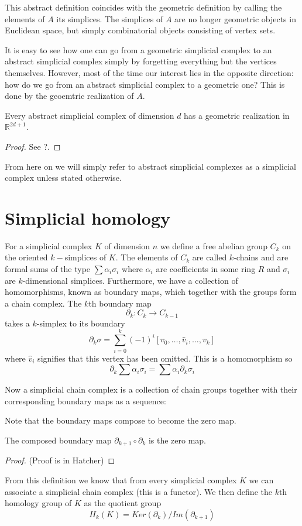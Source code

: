 This abstract definition coincides with the geometric definition by calling the elements of $A$ its simplices. The simplices of $A$ are no longer geometric objects in Euclidean space, but simply combinatorial objects consisting of vertex sets.

It is easy to see how one can go from a geometric simplicial complex to an abstract simplicial complex simply by forgetting everything but the vertices themselves. However, most of the time our interest lies in the opposite direction: how do we go from an abstract simplicial complex to a geometric one? This is done by the geoemtric realization of $A$.

\begin{theorem}
Every abstract simplicial complex of dimension $d$ has a geometric realization in $\mathbb{R}^{2d+1}$.
\end{theorem}
\begin{proof}
See ?.
\end{proof}%
From here on we will simply refer to abstract simplicial complexes as a simplicial complex unless stated otherwise.
\section{Simplicial homology}
For a simplicial complex $K$ of dimension $n$ we define a free abelian group $C_{k}$ on the oriented $k-$simplices of $K$.
The elements of $C_{k}$ are called $k$-chains and are formal sums of the type
$\sum \alpha_{i} \sigma_{i}$
where $\alpha_{i}$ are coefficients in some ring $R$ and $\sigma_{i}$ are $k$-dimensional simplices. Furthermore, we have a collection of homomorphisms, known as boundary maps, which together with the groups form a chain complex. The $k$th boundary map
\[ \partial_{k}: C_{k} \to C_{k-1}\]
takes a $k$-simplex to its boundary
\[ \partial_{k} \sigma = \sum^{k}_{{i=0}} (-1)^{i} [v_{0},\dots,\hat v_{i}, \dots, v_{k}]\]
where $\hat v_{i}$ signifies that this vertex has been omitted. This is a homomorphism so
\[\partial_{k} \sum \alpha_{i}\sigma_{i} = \sum \alpha_{i} \partial_{k} \sigma_{i}\]

Now a simplicial chain complex is a collection of chain groups together with their corresponding boundary maps as a sequence:
\begin{center}
\end{center}
Note that the boundary maps compose to become the zero map.
\begin{theorem}
The composed boundary map $\partial_{k+1} \circ \partial_{k}$ is the zero map.
\end{theorem}
\begin{proof}
(Proof is in Hatcher)
\end{proof}
From this definition we know that from every simplicial complex $K$ we can associate a simplicial chain complex (this is a functor). We then define the $k$th homology group of $K$ as the quotient group
\[H_{k}(K) = Ker(\partial_{k})/Im(\partial_{k+1})\]

